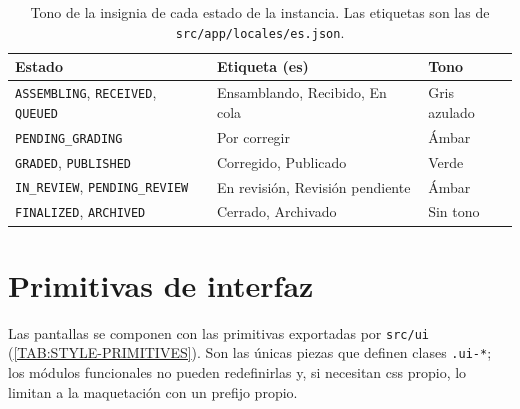 \begin{table}[htbp]
  \centering
  \small
  \begin{tabular}{lll}
    \toprule
    \textbf{Estado} & \textbf{Etiqueta (es)} & \textbf{Tono} \\
    \midrule
    \texttt{ASSEMBLING}, \texttt{RECEIVED}, \texttt{QUEUED} & Ensamblando, Recibido, En cola & Gris azulado \\
    \texttt{PENDING\_GRADING} & Por corregir & Ámbar \\
    \texttt{GRADED}, \texttt{PUBLISHED} & Corregido, Publicado & Verde \\
    \texttt{IN\_REVIEW}, \texttt{PENDING\_REVIEW} & En revisión, Revisión pendiente & Ámbar \\
    \texttt{FINALIZED}, \texttt{ARCHIVED} & Cerrado, Archivado & Sin tono \\
    \bottomrule
  \end{tabular}
  \caption{Tono de la insignia de cada estado de la instancia. Las etiquetas son las
    de \texttt{src/app/locales/es.json}.\label{TAB:STYLE-STATUS}}
\end{table}

\section*{Primitivas de interfaz}

Las pantallas se componen con las primitivas exportadas por \texttt{src/ui}
(\cref{TAB:STYLE-PRIMITIVES}). Son las únicas piezas que definen clases
\texttt{.ui-*}; los módulos funcionales no pueden redefinirlas y, si necesitan
\acs{css} propio, lo limitan a la maquetación con un prefijo propio.

